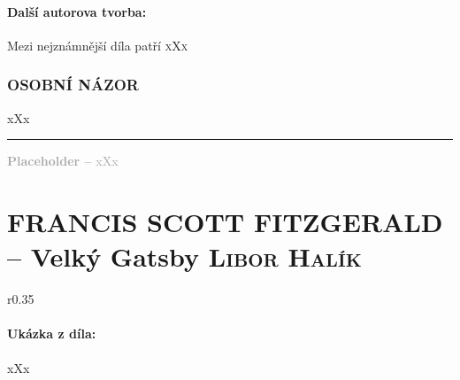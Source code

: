 \documentclass[A4paper]{extarticle} %
\begin{document}
\subsection*{Další autorova tvorba:}
\noindent 
Mezi nejznámnější díla patří \textsc{xXx}






\section*{OSOBNÍ NÁZOR}
\noindent 
xXx

\vfill

\noindent\begin{minipage}{\textwidth}
    \textcolor{darkgray}{\rule{\linewidth}{0.4pt}
    \footnotesize
    \textbf{Placeholder --} xXx
    }
\end{minipage}

\newpage


\changefontsize{8pt}

\part*{FRANCIS SCOTT FITZGERALD -- Velký Gatsby {\hfill \normalfont\tiny\textsc{Libor Halík}}}

\noindent\begin{wrapfigure}{r}{0.35\textwidth}
\tiny

\subsection*{Ukázka z díla:}
\setlength{\parindent}{3pt}
xXx
\end{wrapfigure}
\end{document}
